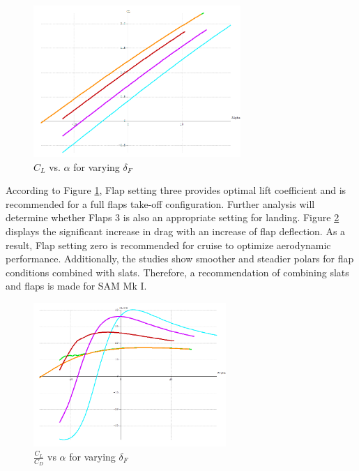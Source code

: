 \begin{figure}[!h]
    \centering
    \includegraphics[width=0.70\textwidth]{Photos/aero/CL_o_alpha.png}
    \caption{$C_L$ vs. $\alpha$ for varying $\delta_F$}
    \label{fig:clalphahigh}
\end{figure}
According to Figure \ref{fig:clalphahigh}, Flap setting three provides optimal lift coefficient and is recommended for a full flaps take-off configuration.  Further analysis will determine whether Flaps 3 is also an appropriate setting for landing.  Figure \ref{fig:clcdalphahigh} displays the significant increase in drag with an increase of flap deflection.  As a result, Flap setting zero is recommended for cruise to optimize aerodynamic performance.  Additionally, the studies show smoother and steadier polars for flap conditions combined with slats.  Therefore, a recommendation of combining slats and flaps is made for SAM Mk I.

\begin{figure}[!h]
    \centering
    \includegraphics[width=0.65\textwidth]{Photos/aero/CL_CD_o_alpha.png}
    \caption{$\frac{C_L}{C_D}$ vs $\alpha$ for varying $\delta_F$}
    \label{fig:clcdalphahigh}
\end{figure}

